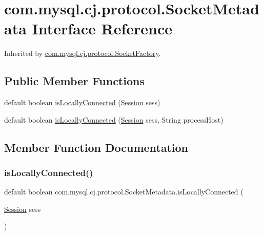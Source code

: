 \hypertarget{interfacecom_1_1mysql_1_1cj_1_1protocol_1_1_socket_metadata}{}\section{com.\+mysql.\+cj.\+protocol.\+Socket\+Metadata Interface Reference}
\label{interfacecom_1_1mysql_1_1cj_1_1protocol_1_1_socket_metadata}


Inherited by \mbox{\hyperlink{interfacecom_1_1mysql_1_1cj_1_1protocol_1_1_socket_factory}{com.\+mysql.\+cj.\+protocol.\+Socket\+Factory}}.

\subsection*{Public Member Functions}
\begin{DoxyCompactItemize}
\item 
default boolean \mbox{\hyperlink{interfacecom_1_1mysql_1_1cj_1_1protocol_1_1_socket_metadata_ae786655db2998b2391b183fdad43e02c}{is\+Locally\+Connected}} (\mbox{\hyperlink{interfacecom_1_1mysql_1_1cj_1_1_session}{Session}} sess)
\item 
default boolean \mbox{\hyperlink{interfacecom_1_1mysql_1_1cj_1_1protocol_1_1_socket_metadata_a4fd9ea6b94011181271df349c840ecf0}{is\+Locally\+Connected}} (\mbox{\hyperlink{interfacecom_1_1mysql_1_1cj_1_1_session}{Session}} sess, String process\+Host)
\end{DoxyCompactItemize}


\subsection{Member Function Documentation}
\mbox{\label{interfacecom_1_1mysql_1_1cj_1_1protocol_1_1_socket_metadata_ae786655db2998b2391b183fdad43e02c}} 
\subsubsection{\texorpdfstring{is\+Locally\+Connected()}{isLocallyConnected()}\hspace{0.1cm}{\footnotesize\ttfamily [1/2]}}
{\footnotesize\ttfamily default boolean com.\+mysql.\+cj.\+protocol.\+Socket\+Metadata.\+is\+Locally\+Connected (\begin{DoxyParamCaption}\item[{\mbox{\hyperlink{interfacecom_1_1mysql_1_1cj_1_1_session}{Session}}}]{sess }\end{DoxyParamCaption})}



